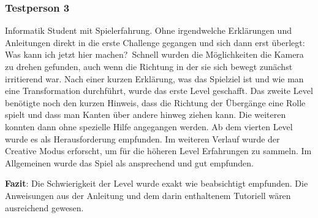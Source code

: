 \subsubsection*{Testperson 3}

Informatik Student mit Spielerfahrung. Ohne irgendwelche Erklärungen und Anleitungen direkt in die erste Challenge gegangen und sich dann erst überlegt: \glqq Was kann ich jetzt hier machen?\grqq~Schnell wurden die Möglichkeiten die Kamera zu drehen gefunden, auch wenn die Richtung in der sie sich bewegt zunächst irritierend war. Nach einer kurzen Erklärung, was das Spielziel ist und wie man eine Transformation durchführt, wurde das erste Level geschafft. Das zweite Level benötigte noch den kurzen Hinweis, dass die Richtung der Übergänge eine Rolle spielt und dass man Kanten über andere hinweg ziehen kann. Die weiteren konnten dann ohne spezielle Hilfe angegangen werden. Ab dem vierten Level wurde es als Herausforderung empfunden. Im weiteren Verlauf wurde der Creative Modus erforscht, um für die höheren Level Erfahrungen zu sammeln. Im Allgemeinen wurde das Spiel als ansprechend und gut empfunden.

{\bf Fazit}: Die Schwierigkeit der Level wurde exakt wie beabsichtigt empfunden. Die Anweisungen aus der Anleitung und dem darin enthaltenem Tutoriell wären ausreichend gewesen.





